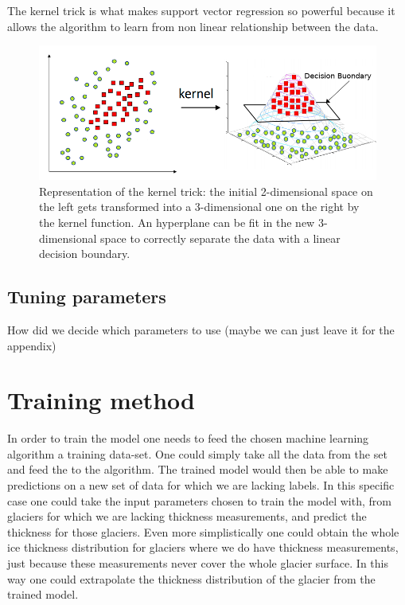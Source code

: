 The kernel trick is what makes support vector regression so powerful because it allows the algorithm to learn from non linear relationship between the data.

\begin{figure}[!tp]
	\centering		  
	\includegraphics[width=1.\textwidth]{figures/kernel_trick.png}
	\caption{Representation of the kernel trick: the initial 2-dimensional space on the left gets transformed into a 3-dimensional one on the right by the kernel function. An hyperplane can be fit in the new 3-dimensional space to correctly separate the data with a linear decision boundary.}
	\label{fig:kernel}
\end{figure}

\subsection{Tuning parameters}
How did we decide which parameters to use (maybe we can just leave it for the appendix)

\section{Training method}\label{training}
In order to train the model one needs to feed the chosen machine learning algorithm a training data-set. One could simply take all the data from the set and feed the to the algorithm. The trained model would then be able to make predictions on a new set of data for which we are lacking labels. In this specific case one could take the input parameters chosen to train the model with, from glaciers for which we are lacking thickness measurements, and predict the thickness for those glaciers. Even more simplistically one could obtain the whole ice thickness distribution for glaciers where we do have thickness measurements, just because these measurements never cover the whole glacier surface. In this way one could extrapolate the thickness distribution of the glacier from the trained model.

